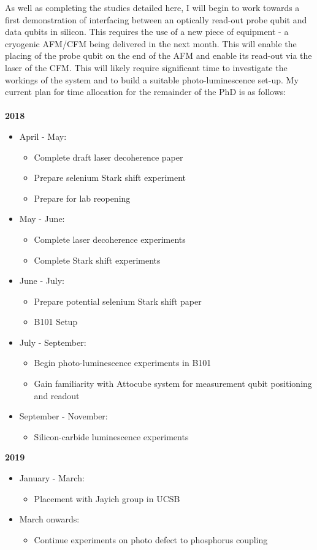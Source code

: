 As well as completing the studies detailed here, I will begin to work towards a first demonstration of interfacing between an optically read-out probe qubit and data qubits in silicon.
This requires the use of a new piece of equipment - a cryogenic AFM/CFM being delivered in the next month.
This will enable the placing of the probe qubit on the end of the AFM and enable its read-out via the laser of the CFM.
This will likely require significant time to investigate the workings of the system and to build a suitable photo-luminescence set-up.
My current plan for time allocation for the remainder of the PhD is as follows:
\\
\\
\textbf{2018}
\begin{itemize}
\item April - May:
\begin{itemize}
\item Complete draft laser decoherence paper
\item Prepare selenium Stark shift experiment
\item Prepare for lab reopening
\end{itemize}
\item May - June:
\begin{itemize}
	\item Complete laser decoherence experiments
	\item Complete Stark shift experiments
\end{itemize}
\item June - July:
\begin{itemize}
	\item Prepare potential selenium Stark shift paper
	\item B101 Setup
\end{itemize}
\item July - September:
\begin{itemize}
\item Begin photo-luminescence experiments in B101
\item Gain familiarity with Attocube system for measurement qubit positioning and readout
\end{itemize}
\item September - November:
\begin{itemize}
\item Silicon-carbide luminescence experiments
\end{itemize}
\end{itemize}
\textbf{2019}
\begin{itemize}
\item January - March:
\begin{itemize}
	\item Placement with Jayich group in UCSB
\end{itemize}
\item March onwards:
\begin{itemize}
\item Continue experiments on photo defect to phosphorus coupling
\end{itemize}
\end{itemize}
